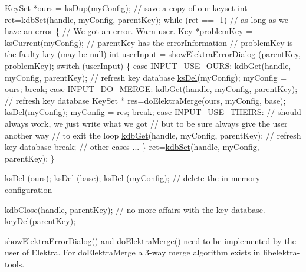 \begin{DoxyCodeInclude}
KeySet *ours = \hyperlink{group__keyset_gac59e4b328245463f1451f68d5106151c}{ksDup}(myConfig); \textcolor{comment}{// save a copy of our keyset}
\textcolor{keywordtype}{int} ret=\hyperlink{group__kdb_ga11436b058408f83d303ca5e996832bcf}{kdbSet}(handle, myConfig, parentKey);
\textcolor{keywordflow}{while} (ret == -1) \textcolor{comment}{// as long as we have an error}
\{
        \textcolor{comment}{// We got an error. Warn user.}
        Key *problemKey = \hyperlink{group__keyset_ga4287b9416912c5f2ab9c195cb74fb094}{ksCurrent}(myConfig);
        \textcolor{comment}{// parentKey has the errorInformation}
        \textcolor{comment}{// problemKey is the faulty key (may be null)}
        \textcolor{keywordtype}{int} userInput = showElektraErrorDialog (parentKey, problemKey);
        \textcolor{keywordflow}{switch} (userInput)
        \{
        \textcolor{keywordflow}{case} INPUT\_USE\_OURS:
                \hyperlink{group__kdb_ga28e385fd9cb7ccfe0b2f1ed2f62453a1}{kdbGet}(handle, myConfig, parentKey); \textcolor{comment}{// refresh key
       database}
                \hyperlink{group__keyset_ga27e5c16473b02a422238c8d970db7ac8}{ksDel}(myConfig);
                myConfig = ours;
                \textcolor{keywordflow}{break};
        \textcolor{keywordflow}{case} INPUT\_DO\_MERGE:
                \hyperlink{group__kdb_ga28e385fd9cb7ccfe0b2f1ed2f62453a1}{kdbGet}(handle, myConfig, parentKey); \textcolor{comment}{// refresh key
       database}
                KeySet * res=doElektraMerge(ours, myConfig, base);
                \hyperlink{group__keyset_ga27e5c16473b02a422238c8d970db7ac8}{ksDel}(myConfig);
                myConfig = res;
                \textcolor{keywordflow}{break};
        \textcolor{keywordflow}{case} INPUT\_USE\_THEIRS:
                \textcolor{comment}{// should always work, we just write what we got}
                \textcolor{comment}{// but to be sure always give the user another way}
                \textcolor{comment}{// to exit the loop}
                \hyperlink{group__kdb_ga28e385fd9cb7ccfe0b2f1ed2f62453a1}{kdbGet}(handle, myConfig, parentKey); \textcolor{comment}{// refresh key
       database}
                \textcolor{keywordflow}{break};
        \textcolor{comment}{// other cases ...}
        \}
        ret=\hyperlink{group__kdb_ga11436b058408f83d303ca5e996832bcf}{kdbSet}(handle, myConfig, parentKey);
\}

\hyperlink{group__keyset_ga27e5c16473b02a422238c8d970db7ac8}{ksDel} (ours);
\hyperlink{group__keyset_ga27e5c16473b02a422238c8d970db7ac8}{ksDel} (base);
\hyperlink{group__keyset_ga27e5c16473b02a422238c8d970db7ac8}{ksDel} (myConfig); \textcolor{comment}{// delete the in-memory configuration}

\hyperlink{group__kdb_gadb54dc9fda17ee07deb9444df745c96f}{kdbClose}(handle, parentKey); \textcolor{comment}{// no more affairs with the key database.}
\hyperlink{group__key_ga3df95bbc2494e3e6703ece5639be5bb1}{keyDel}(parentKey);
\end{DoxyCodeInclude}
 show\-Elektra\-Error\-Dialog() and do\-Elektra\-Merge() need to be implemented by the user of Elektra. For do\-Elektra\-Merge a 3-\/way merge algorithm exists in libelektra-\/tools.


